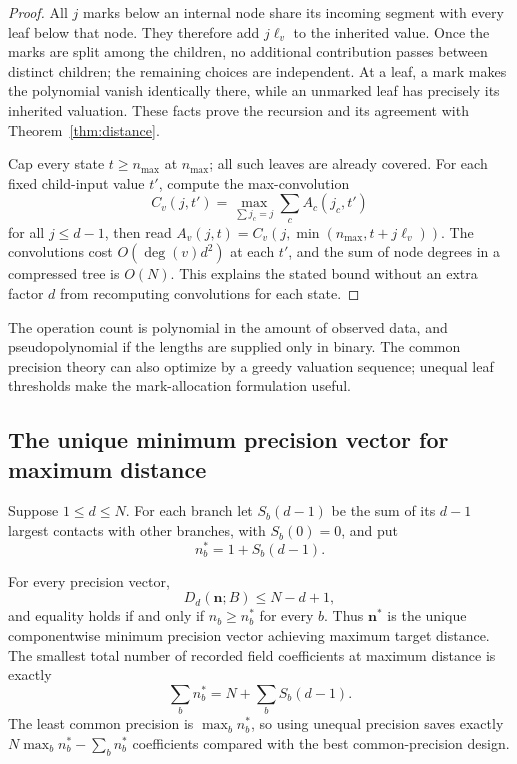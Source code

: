 \begin{proof}
All $j$ marks below an internal node share its incoming segment with every
leaf below that node. They therefore add $j\ell_v$ to the inherited value.
Once the marks are split among the children, no additional contribution
passes between distinct children; the remaining choices are independent.
At a leaf, a mark makes the polynomial vanish identically there, while an
unmarked leaf has precisely its inherited valuation. These facts prove the
recursion and its agreement with Theorem~\ref{thm:distance}.

Cap every state $t\ge n_{\max}$ at $n_{\max}$; all such leaves are already
covered. For each fixed child-input value $t'$, compute the max-convolution
\[
 C_v(j,t')=\max_{\sum j_c=j}\sum_cA_c(j_c,t')
\]
for all $j\le d-1$, then read
$A_v(j,t)=C_v(j,\min(n_{\max},t+j\ell_v))$.
The convolutions cost $O(\deg(v)d^2)$ at each $t'$, and the sum of node
degrees in a compressed tree is $O(N)$. This explains the stated bound
without an extra factor $d$ from recomputing convolutions for each state.
\end{proof}

The operation count is polynomial in the amount of observed data, and
pseudopolynomial if the lengths are supplied only in binary. The common
precision theory can also optimize by a greedy valuation sequence; unequal
leaf thresholds make the mark-allocation formulation useful.

\subsection{The unique minimum precision vector for maximum distance}

Suppose $1\le d\le N$. For each branch let $S_b(d-1)$ be the sum of its
$d-1$ largest contacts with other branches, with $S_b(0)=0$, and put
\[
 n_b^*=1+S_b(d-1).
\]

\begin{theorem}\label{thm:saturation}
For every precision vector,
\[
 D_d(\mathbf n;B)\le N-d+1,
\]
and equality holds if and only if $n_b\ge n_b^*$ for every $b$.
Thus $\mathbf n^*$ is the unique componentwise minimum precision vector
achieving maximum target distance. The smallest total number of recorded
field coefficients at maximum distance is exactly
\[
 \sum_bn_b^*=N+\sum_bS_b(d-1).
\]
The least common precision is $\max_bn_b^*$, so using unequal precision saves
exactly $N\max_bn_b^*-\sum_bn_b^*$ coefficients compared with the best
common-precision design.
\end{theorem}

